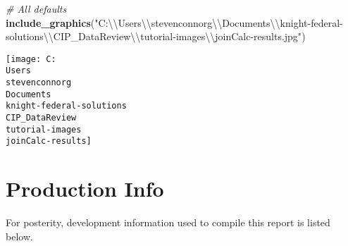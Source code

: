 \documentclass[]{article}
\newenvironment{Shaded}{\begin{snugshade}}{\end{snugshade}}
\newcommand{\KeywordTok}[1]{\textcolor[rgb]{0.13,0.29,0.53}{\textbf{#1}}}
\newcommand{\CharTok}[1]{\textcolor[rgb]{0.31,0.60,0.02}{#1}}
\newcommand{\StringTok}[1]{\textcolor[rgb]{0.31,0.60,0.02}{#1}}
\newcommand{\CommentTok}[1]{\textcolor[rgb]{0.56,0.35,0.01}{\textit{#1}}}
\newcommand{\NormalTok}[1]{#1}
\begin{document}
\begin{Shaded}
\begin{Highlighting}[]
\CommentTok{# All defaults}
\KeywordTok{include_graphics}\NormalTok{(}\StringTok{"C:}\CharTok{\textbackslash{}\textbackslash{}}\StringTok{Users}\CharTok{\textbackslash{}\textbackslash{}}\StringTok{stevenconnorg}\CharTok{\textbackslash{}\textbackslash{}}\StringTok{Documents}\CharTok{\textbackslash{}\textbackslash{}}\StringTok{knight-federal-solutions}\CharTok{\textbackslash{}\textbackslash{}}\StringTok{CIP_DataReview}\CharTok{\textbackslash{}\textbackslash{}}\StringTok{tutorial-images}\CharTok{\textbackslash{}\textbackslash{}}\StringTok{joinCalc-results.jpg"}\NormalTok{)}
\end{Highlighting}
\end{Shaded}

\texttt{[image: C:\\Users\\stevenconnorg\\Documents\\knight-federal-solutions\\CIP\_DataReview\\tutorial-images\\joinCalc-results]}

\pagebreak

\section{Production Info}\label{production-info}

For posterity, development information used to compile this report is
listed below.
\end{document}
